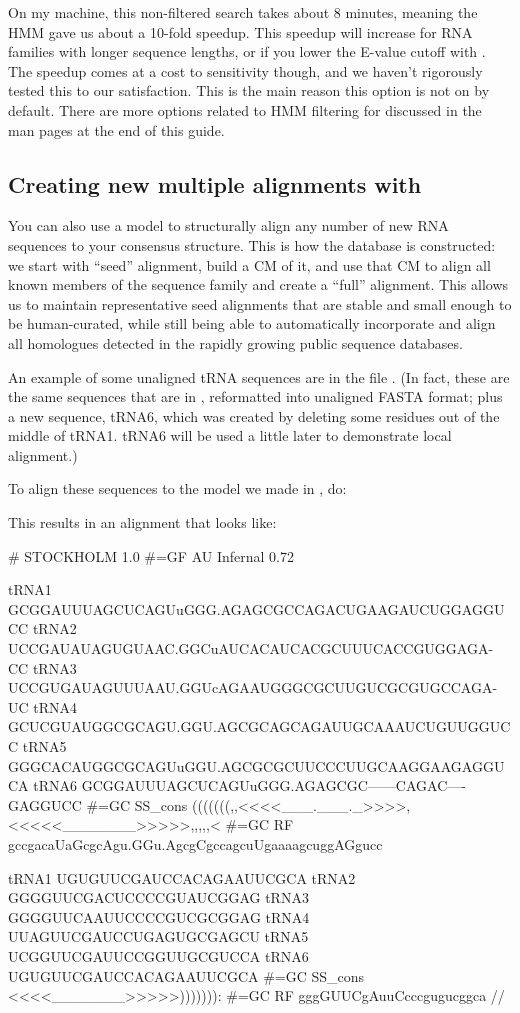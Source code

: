 On my machine, this non-filtered search takes about 8 minutes, meaning
the HMM gave us about a 10-fold speedup. This speedup will increase 
for RNA families with longer sequence lengths, or if you lower the
E-value cutoff with . The speedup comes at a
cost to sensitivity though, and we haven't
rigorously tested this to our satisfaction. This is the main reason
this option is not on by default. There are more options related to
HMM filtering for  discussed in the man pages at the
end of this guide.

\subsection{Creating new multiple alignments with }

You can also use a model to structurally align any number of new RNA
sequences to your consensus structure. This is how the 
database is constructed: we start with ``seed'' alignment, build a CM
of it, and use that CM to align all known members of the sequence
family and create a ``full'' alignment. This allows us to maintain
representative seed alignments that are stable and small enough to be
human-curated, while still being able to automatically incorporate and
align all homologues detected in the rapidly growing public sequence
databases.

An example of some unaligned tRNA sequences are in the file
. (In fact, these are the same sequences that are in
, reformatted into unaligned FASTA format; plus a
new sequence, tRNA6, which was created by deleting some residues out
of the middle of tRNA1. tRNA6 will be used a little later to
demonstrate local alignment.)

To align these sequences to the model we made in , do:


This results in an alignment that looks like:

{\samepage
\begin{sreoutput}
# STOCKHOLM 1.0
#=GF AU    Infernal 0.72

tRNA1             GCGGAUUUAGCUCAGUuGGG.AGAGCGCCAGACUGAAGAUCUGGAGGUCC
tRNA2             UCCGAUAUAGUGUAAC.GGCuAUCACAUCACGCUUUCACCGUGGAGA-CC
tRNA3             UCCGUGAUAGUUUAAU.GGUcAGAAUGGGCGCUUGUCGCGUGCCAGA-UC
tRNA4             GCUCGUAUGGCGCAGU.GGU.AGCGCAGCAGAUUGCAAAUCUGUUGGUCC
tRNA5             GGGCACAUGGCGCAGUuGGU.AGCGCGCUUCCCUUGCAAGGAAGAGGUCA
tRNA6             GCGGAUUUAGCUCAGUuGGG.AGAGCGC------CAGAC----GAGGUCC
#=GC SS_cons      (((((((,,<<<<___.___._>>>>,<<<<<_______>>>>>,,,,,<
#=GC RF           gccgacaUaGcgcAgu.GGu.AgcgCgccagcuUgaaaagcuggAGgucc

tRNA1             UGUGUUCGAUCCACAGAAUUCGCA
tRNA2             GGGGUUCGACUCCCCGUAUCGGAG
tRNA3             GGGGUUCAAUUCCCCGUCGCGGAG
tRNA4             UUAGUUCGAUCCUGAGUGCGAGCU
tRNA5             UCGGUUCGAUUCCGGUUGCGUCCA
tRNA6             UGUGUUCGAUCCACAGAAUUCGCA
#=GC SS_cons      <<<<_______>>>>>))))))):
#=GC RF           gggGUUCgAuuCcccgugucggca
//
\end{sreoutput}
}

